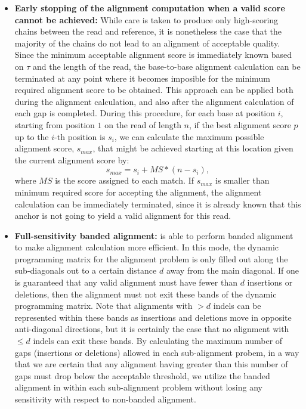 \begin{itemize}
    \item \textbf{Early stopping of the alignment computation when a valid score cannot be achieved:} While care is taken to produce only high-scoring chains between the read and reference, it is nonetheless the case that the majority of the chains do not lead to an alignment of acceptable quality. Since the minimum acceptable alignment score is immediately known based on $\tau$ and the length of the read, the base-to-base alignment calculation can be terminated at any point where it becomes imposible for the minimum required alignment score to be obtained. This approach can be applied both during the \ksw alignment calculation, and also after the alignment calculation of each gap is completed. 
    During this procedure, for each base at position $i$, starting from position $1$ on the read of length $n$, if the best alignment score $p$ up to the $i$-th position is $s_i$, we can calculate the maximum possible alignment score, $s_{max}$, that might be achieved starting at this location given the current alignment score by:
    \begin{equation}
        s_{max} = s_i + MS * (n - s_i),
    \end{equation}
    where $MS$ is the score assigned to each match. If $s_{max}$ is smaller than minimum required score for accepting the alignment, the alignment calculation can be immediately terminated, since it is already known that this anchor is not going to yield a valid alignment for this read.

    \item \textbf{Full-sensitivity banded alignment:} \ksw is able to perform banded 
    alignment to make alignment calculation more efficient. In this mode, the dynamic 
    programming matrix for the alignment problem is only filled out along the sub-diagonals 
    out to a certain distance $d$ away from the main diagonal. If one is guaranteed that any 
    valid alignment must have fewer than $d$ insertions or deletions, then the alignment must 
    not exit these bands of the dynamic programming matrix.  Note that alignments with 
    $> d$ indels can be represented within these bands as insertions and deletions move 
    in opposite anti-diagonal directions, but it is certainly the case that no alignment
    with $\le d$ indels can exit these bands. By calculating the maximum number of gaps 
    (insertions or deletions) allowed in each sub-alignment probem, in a way that we are 
    certain that any alignment having greater than this number of gaps must drop below 
    the acceptable threshold, we utilize the banded alignment in \ksw within each 
    sub-alignment problem without losing any sensitivity with respect to non-banded alignment.
\end{itemize}

